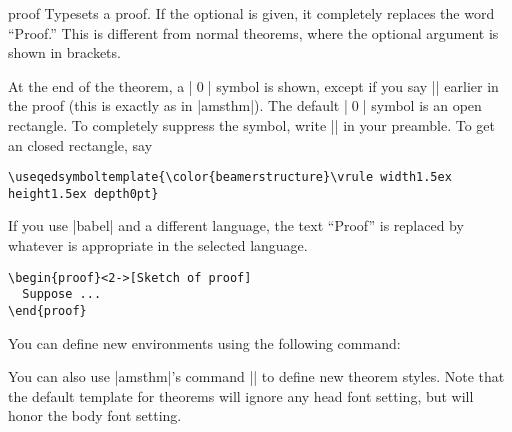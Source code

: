 \begin{environment}{{proof}}
  Typesets a proof. If the optional  is given, it
  completely replaces the word ``Proof.'' This is different from
  normal theorems, where the optional argument is shown in brackets.

  At the end of the theorem, a |\qed| symbol is shown, except if you
  say |\qedhere| earlier in the proof (this is exactly as in
  |amsthm|). The default |\qed| symbol is an open rectangle. To
  completely suppress the symbol, write |\def\qedsymbol{}| in 
  your preamble. To get an closed rectangle, say
\begin{verbatim}
\useqedsymboltemplate{\color{beamerstructure}\vrule width1.5ex height1.5ex depth0pt}
\end{verbatim}

  If you use |babel| and a different language, the text ``Proof'' is
  replaced by whatever is appropriate in the selected language.

  \example
\begin{verbatim}
\begin{proof}<2->[Sketch of proof]
  Suppose ...
\end{proof}
\end{verbatim}
\end{environment}

You can define new environments using the following command:


You can also use |amsthm|'s command |\newtheoremstyle| to define new
theorem styles. Note that the default template for theorems will
ignore any head font setting, but will honor the body font setting.

